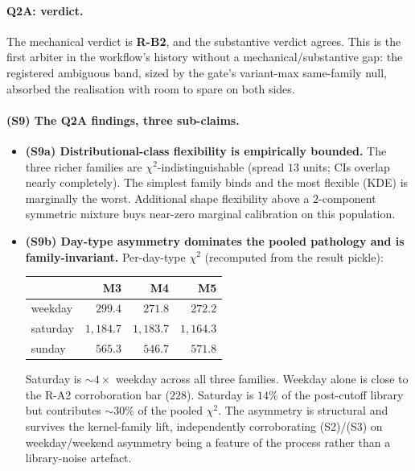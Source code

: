 \documentclass[11pt]{article}
\theoremstyle{definition}
\theoremstyle{plain}
\begin{document}
\paragraph{Q2A: verdict.}
The mechanical verdict is \textbf{R-B2}, and the substantive verdict
agrees. This is the first arbiter in the workflow's history without
a mechanical/substantive gap: the registered ambiguous band, sized
by the gate's variant-max same-family null, absorbed the realisation
with room to spare on both sides.

\paragraph{(S9) The Q2A findings, three sub-claims.}
\begin{itemize}[leftmargin=2em]
\item \textbf{(S9a) Distributional-class flexibility is empirically
bounded.} The three richer families are $\chi^{2}$-indistinguishable
(spread $13$ units; CIs overlap nearly completely). The simplest
family binds and the most flexible (KDE) is marginally the worst.
Additional shape flexibility above a $2$-component symmetric
mixture buys near-zero marginal calibration on this population.

\item \textbf{(S9b) Day-type asymmetry dominates the pooled
pathology and is family-invariant.} Per-day-type $\chi^{2}$
(recomputed from the result pickle):
\begin{center}
\begin{tabular}{lrrr}
\toprule
& M3 & M4 & M5 \\
\midrule
weekday  & $299.4$  & $271.8$  & $272.2$ \\
saturday & $1{,}184.7$ & $1{,}183.7$ & $1{,}164.3$ \\
sunday   & $565.3$  & $546.7$  & $571.8$ \\
\bottomrule
\end{tabular}
\end{center}
Saturday is $\sim 4\times$ weekday across all three families.
Weekday alone is close to the R-A2 corroboration bar ($228$).
Saturday is $14\%$ of the post-cutoff library but contributes
$\sim 30\%$ of the pooled $\chi^{2}$. The asymmetry is structural
and survives the kernel-family lift, independently corroborating
(S2)/(S3) on weekday/weekend asymmetry being a feature of the
process rather than a library-noise artefact.


\end{itemize}
\end{document}
